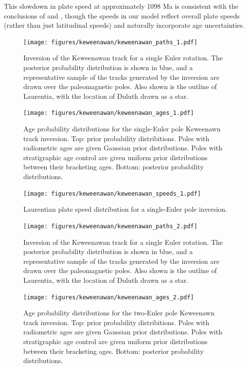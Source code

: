 \documentclass[preprint,12pt,authoryear]{elsarticle}
\begin{document}
This slowdown in plate speed at approximately 1098 Ma is consistent with the conclusions of
\citet{davis1997geochronology} and \citet{swanson2009no}, though the speeds in our
model reflect overall plate speeds (rather than just latitudinal speeds) and naturally incorporate age uncertainties.

\begin{figure}
\texttt{[image: figures/keweenawan/keweenawan\_paths\_1.pdf]}
\caption[Inversion of the Keweenawan track for a single Euler rotation]{Inversion of the Keweenawan track for a single Euler rotation. The posterior probability distribution is shown in blue, and a representative sample of the tracks generated by the inversion are drawn over the paleomagnetic poles. Also shown is the outline of Laurentia, with the location of Duluth drawn as a star.}
\label{fig:keweenawan_paths_1}
\end{figure}
\begin{figure}
\texttt{[image: figures/keweenawan/keweenawan\_ages\_1.pdf]}
\caption[Age probability distributions for the single-Euler pole Keweenawan track inversion]{Age probability distributions for the single-Euler pole Keweenawn track inversion. Top: prior probability distribitions. Poles with radiometric ages are given Gaussian prior distributions. Poles with stratigraphic age control are given uniform prior distributions between their bracketing ages. Bottom: posterior probability distributions.}
\label{fig:keweenawan_ages_1}
\end{figure}
\begin{figure}
\texttt{[image: figures/keweenawan/keweenawan\_speeds\_1.pdf]}
\caption[Laurentian plate speed distribution for a single-Euler pole inversion]{Laurentian plate speed distribution for a single-Euler pole inversion.}
\label{fig:keweenawan_speeds_1}
\end{figure}
\begin{figure}
\texttt{[image: figures/keweenawan/keweenawan\_paths\_2.pdf]}
\caption[Inversion of the Keweenawan track for two Euler rotations]{Inversion of the Keweenawan track for a single Euler rotation. The posterior probability distribution is shown in blue, and a representative sample of the tracks generated by the inversion are drawn over the paleomagnetic poles. Also shown is the outline of Laurentia, with the location of Duluth drawn as a star.}
\label{fig:keweenawan_paths_2}
\end{figure}
\begin{figure}
\texttt{[image: figures/keweenawan/keweenawan\_ages\_2.pdf]}
\caption[Age probability distributions for the two-Euler pole Keweenawan track inversion]{Age probability distributions for the two-Euler pole Keweenawn track inversion. Top: prior probability distribitions. Poles with radiometric ages are given Gaussian prior distributions. Poles with stratigraphic age control are given uniform prior distributions between their bracketing ages. Bottom: posterior probability distributions.}
\label{fig:keweenawan_ages_2}
\end{figure}
\end{document}

